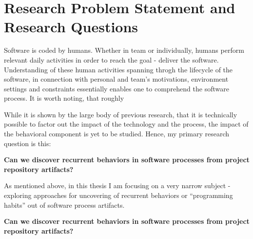 \section{Research Problem Statement and Research Questions}
Software is coded by humans. Whether in team or individually, humans perform relevant 
daily activities in order to reach the goal - deliver the software. Understanding of these
human activities spanning throgh the lifecycle of the software, in connection with personal 
and team's motivations, environment settings and constraints essentially enables one to
comprehend the software process. It is worth noting, that roughly 



While it is shown by the large body of previous research, that it is technically possible 
to factor out the impact of the technology and the process, the impact of the behavioral 
component is yet to be studied. Hence, my primary research question is this:
\begin{myindentpar}{0.07\linewidth}
 \textbf{Can we discover recurrent behaviors in software processes from project
  repository artifacts?}
\end{myindentpar}
 
As mentioned above, in this thesis I am focusing on a very narrow subject - exploring approaches
for uncovering of recurrent behaviors or ``programming habits'' out of software process artifacts.
\begin{myindentpar}{0.07\linewidth}
 \textbf{Can we discover recurrent behaviors in software processes from project
  repository artifacts?}
\end{myindentpar}
